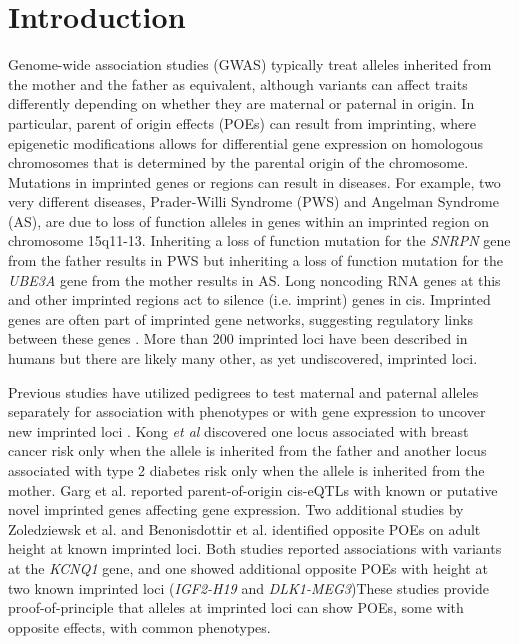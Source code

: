 \section{Introduction}\label{ch02-introduction}
Genome-wide association studies (GWAS) typically treat alleles inherited from the mother and the father as equivalent, although variants can affect traits differently depending on whether they are maternal or paternal in origin. In particular, parent of origin effects (POEs) can result from imprinting, where epigenetic modifications allows for differential gene expression on homologous chromosomes that is determined by the parental origin of the chromosome. Mutations in imprinted genes or regions can result in diseases. For example, two very different diseases, Prader-Willi Syndrome (PWS) and Angelman Syndrome (AS), are due to loss of function alleles in genes within an imprinted region on chromosome 15q11-13. Inheriting a loss of function mutation for the \emph{SNRPN} gene from the father results in PWS but inheriting a loss of function mutation for the \emph{UBE3A} gene from the mother results in AS\citep{Peters2014,Falls1999}.  Long noncoding RNA genes at this and other imprinted regions act to silence (i.e. imprint) genes in cis. Imprinted genes are often part of imprinted gene networks, suggesting regulatory links between these genes \cite{Patten:2016cb,Gabory:2009be,Varrault:2006kn}. More than 200 imprinted loci have been described in humans \cite{Benonisdottir:2016dz} but there are likely many other, as yet undiscovered, imprinted loci. 

Previous studies have utilized pedigrees to test maternal and paternal alleles separately for association with phenotypes or with gene expression to uncover new imprinted loci \citep{Kong:2009kk,Baran:2015cx,Garg2012a,Paper2014b,Benonisdottir:2016dz}. Kong \emph{et al} \citep{Kong:2009kk} discovered one locus associated with breast cancer risk only when the allele is inherited from the father and another locus associated with type 2 diabetes risk only when the allele is inherited from the mother. Garg et al. reported parent-of-origin cis-eQTLs with known or putative novel imprinted genes affecting gene expression\citep{Garg2012a}. Two additional studies by Zoledziewsk et al. and Benonisdottir et al. identified opposite POEs on adult height at known imprinted loci\citep{Zoledziewska:2015do,Benonisdottir:2016dz}. Both studies reported associations with variants at the \emph{KCNQ1} gene, and one showed additional opposite POEs with height at two known imprinted loci (\emph{IGF2-H19} and \emph{DLK1-MEG3})\citep{Benonisdottir:2016dz}These studies provide proof-of-principle that alleles at imprinted loci can show POEs, some with opposite effects, with common phenotypes. 

